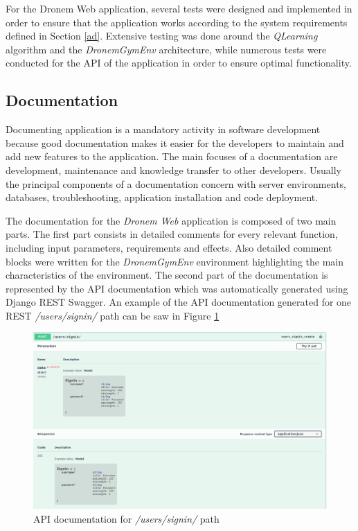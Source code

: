 \par For the Dronem Web application, several tests were designed and implemented in order to ensure that the application works according to the system requirements defined in Section \ref{ad}. Extensive testing was done around the \emph{QLearning} algorithm and the \emph{DronemGymEnv} architecture, while numerous tests were conducted for the API of the application in order to ensure optimal functionality.
\subsection{Documentation}
Documenting application is a mandatory activity in software development because good documentation makes it easier for the developers to maintain and add new features to the application. The main focuses of a documentation are development, maintenance and knowledge transfer to other developers. Usually the principal components of a documentation concern with server environments, databases, troubleshooting, application installation and code deployment.
\par The documentation for the \emph{Dronem Web} application is composed of two main parts. The first part consists in detailed comments for every relevant function, including input parameters, requirements and effects. Also detailed comment blocks were written for the \emph{DronemGymEnv} environment highlighting the main characteristics of the environment. The second part of the documentation is represented by the API documentation which was automatically generated using Django REST Swagger. An example of the API documentation generated for one REST \emph{/users/signin/} path can be saw in Figure \ref{fig:apiDoc} 

\begin{figure}[!htb]
    \centering
    \includegraphics[scale=0.3]{Figures/apiDoc.png}
    \caption{API documentation for \emph{/users/signin/} path}
    \label{fig:apiDoc}
\end{figure}{}

